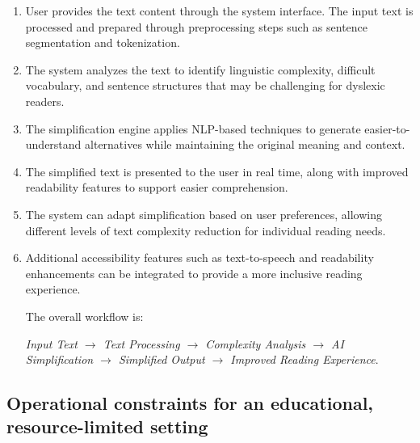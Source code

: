 \documentclass[11pt,a4paper]{article}
\begin{document}
\begin{enumerate}[leftmargin=0.7cm]

    \item User provides the text content through the system interface. The input text is processed and prepared through preprocessing steps such as sentence segmentation and tokenization.

    \item The system analyzes the text to identify linguistic complexity, difficult vocabulary, and sentence structures that may be challenging for dyslexic readers.

    \item The simplification engine applies NLP-based techniques to generate easier-to-understand alternatives while maintaining the original meaning and context.

    \item The simplified text is presented to the user in real time, along with improved readability features to support easier comprehension.

    \item The system can adapt simplification based on user preferences, allowing different levels of text complexity reduction for individual reading needs.

    \item Additional accessibility features such as text-to-speech and readability enhancements can be integrated to provide a more inclusive reading experience.

    The overall workflow is:

    \textit{Input Text $\rightarrow$ Text Processing $\rightarrow$ Complexity Analysis $\rightarrow$ AI Simplification $\rightarrow$ Simplified Output $\rightarrow$ Improved Reading Experience}.

\end{enumerate}

\subsection{Operational constraints for an educational, resource-limited setting}
\end{document}
